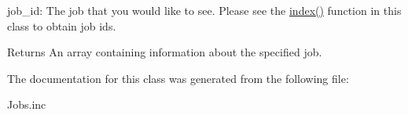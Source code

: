 \begin{DoxyItemize}
\item job\-\_\-id\-: The job that you would like to see. Please see the \hyperlink{classGalaxyJobs_a9472246111b1011169a0900320162fc8}{index()} function in this class to obtain job ids.
\end{DoxyItemize}

\begin{DoxyReturn}{Returns}
An array containing information about the specified job. 
\end{DoxyReturn}


The documentation for this class was generated from the following file\-:\begin{DoxyCompactItemize}
\item 
Jobs.\-inc\end{DoxyCompactItemize}
